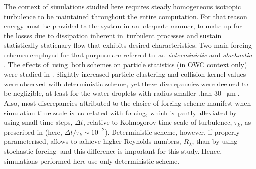 \documentclass{pracamgren}
\begin{document}
\medskip

The context of simulations studied here requires steady homogeneous isotropic turbulence to be maintained throughout the entire computation.
For that reason energy must be provided to the system in an adequate manner, to make up for the losses due to dissipation inherent in~turbulent processes and sustain statistically stationary flow that exhibits desired characteristics.
Two main forcing schemes employed for that purpose are referred to~as~\emph{deterministic} \parencite{Sullivan1994} and \emph{stochastic} \parencite{Eswaran1988}. 
The effects of~using~both schemes on particle statistics (in OWC context only) were studied in \textcite{Rosa2011,Rosa2013,Rosa2015,Parishani2015}.
Slightly increased particle clustering and collision kernel values were observed with deterministic scheme, yet these discrepancies were deemed to be negligible, at least for the water droplets with radius smaller than $30$~$\upmu\text{m}$.
Also, most discrepancies attributed to the choice of forcing scheme manifest when simulation time scale is~correlated with forcing, which is~partly alleviated by using small time steps, $\Delta t$, relative to Kolmogorov time scale of turbulence, $\tau_k$, as prescribed in \textcite{Rosa2015} (here, $\Delta t / \tau_k \sim 10^{-2}$).
Deterministic scheme, however, if properly parameterised, allows to achieve higher Reynolds numbers, $R_{\lambda}$, than by using stochastic forcing, and this difference is important for this study.
Hence, simulations performed here use only deterministic scheme.
\end{document}
